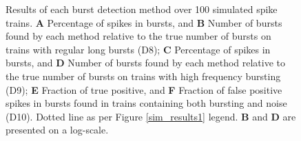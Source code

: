 \documentclass[12pt, titlepage]{article}
\begin{document}
		\begin{figure}
			\centering
			\caption{Results of each burst detection method over 100 simulated spike trains. \textbf{A} Percentage of spikes in bursts, and \textbf{B} Number of bursts found by each method relative to the true number of bursts on trains with regular long bursts (D8); \textbf{C} Percentage of spikes in bursts, and \textbf{D} Number of bursts found by each method relative to the true number of bursts on trains with high frequency bursting (D9); \textbf{E} Fraction of true positive, and \textbf{F} Fraction of false positive spikes in bursts found in trains containing both bursting and noise (D10). Dotted line as per Figure \ref{sim_results1} legend. \textbf{B} and \textbf{D} are presented on a log-scale.}
			\label{sim_results2}
		\end{figure}	
\end{document}
